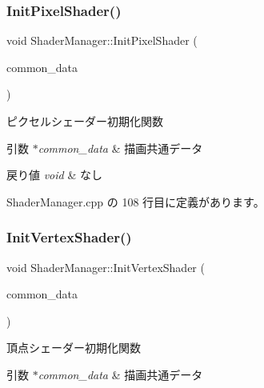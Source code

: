 \subsubsection{\texorpdfstring{Init\+Pixel\+Shader()}{InitPixelShader()}}
{\footnotesize\ttfamily void Shader\+Manager\+::\+Init\+Pixel\+Shader (\begin{DoxyParamCaption}\item[{\mbox{\hyperlink{class_draw_common_data}{Draw\+Common\+Data}} $\ast$}]{common\+\_\+data }\end{DoxyParamCaption})\hspace{0.3cm}{\ttfamily [private]}}



ピクセルシェーダー初期化関数 


\begin{DoxyParams}{引数}
{\em $\ast$common\+\_\+data} & 描画共通データ \\
\hline
\end{DoxyParams}

\begin{DoxyRetVals}{戻り値}
{\em void} & なし \\
\hline
\end{DoxyRetVals}


 Shader\+Manager.\+cpp の 108 行目に定義があります。

\mbox{\label{class_shader_manager_a5bd660c22b7371684e2da37f0804b5ab}} 
\subsubsection{\texorpdfstring{Init\+Vertex\+Shader()}{InitVertexShader()}}
{\footnotesize\ttfamily void Shader\+Manager\+::\+Init\+Vertex\+Shader (\begin{DoxyParamCaption}\item[{\mbox{\hyperlink{class_draw_common_data}{Draw\+Common\+Data}} $\ast$}]{common\+\_\+data }\end{DoxyParamCaption})\hspace{0.3cm}{\ttfamily [private]}}



頂点シェーダー初期化関数 


\begin{DoxyParams}{引数}
{\em $\ast$common\+\_\+data} & 描画共通データ \\
\hline
\end{DoxyParams}

